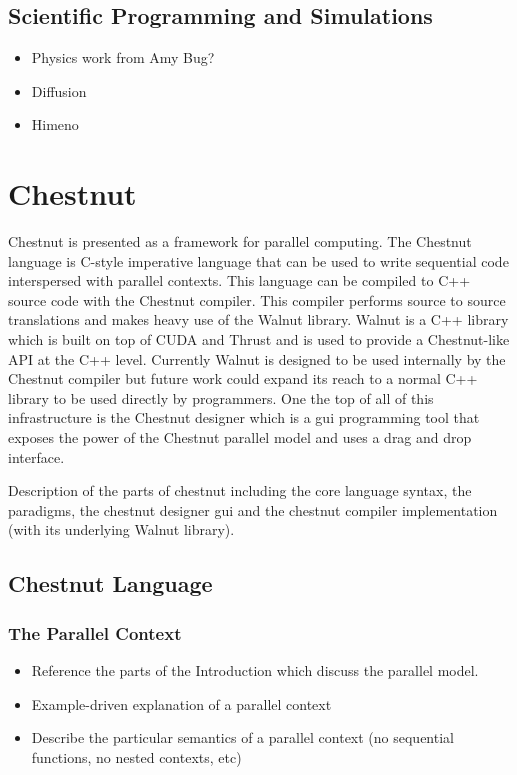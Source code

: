 \subsection{Scientific Programming and Simulations}

\begin{itemize}
\item Physics work from Amy Bug?
\item Diffusion
\item Himeno
\end{itemize}


\section{Chestnut}

Chestnut is presented as a framework for parallel computing. The Chestnut language is C-style imperative language that can be used to write sequential code interspersed with parallel contexts. This language can be compiled to C++ source code with the Chestnut compiler. This compiler performs source to source translations and makes heavy use of the Walnut library. Walnut is a C++ library which is built on top of CUDA and Thrust and is used to provide a Chestnut-like API at the C++ level. Currently Walnut is designed to be used internally by the Chestnut compiler but future work could expand its reach to a normal C++ library to be used directly by programmers. One the top of all of this infrastructure is the Chestnut designer which is a gui programming tool that exposes the power of the Chestnut parallel model and uses a drag and drop interface.

Description of the parts of chestnut including the core language syntax, the paradigms, the chestnut designer gui and the chestnut compiler implementation (with its underlying Walnut library).

\subsection{Chestnut Language}


\subsubsection{The Parallel Context}

\begin{itemize}
\item Reference the parts of the Introduction which discuss the parallel model.  
\item Example-driven explanation of a parallel context
\item Describe the particular semantics of a parallel context (no sequential functions, no nested contexts, etc)
\end{itemize}

